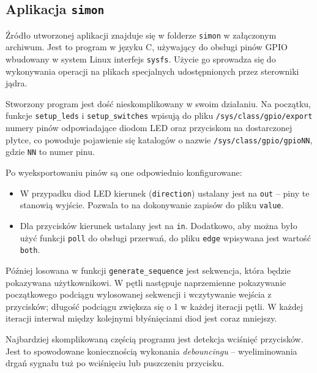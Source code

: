 \documentclass[10pt,a4paper]{article}
\begin{document}
\subsection{Aplikacja \texttt{simon}}

Źródło utworzonej aplikacji znajduje się w folderze \verb+simon+ w załączonym archiwum. Jest to program w języku C, używający do obsługi pinów GPIO wbudowany w system Linux interfejs \verb+sysfs+. Użycie go sprowadza się do wykonywania operacji na plikach specjalnych udostępnionych przez sterowniki jądra.

Stworzony program jest dość nieskomplikowany w swoim działaniu. Na początku, funkcje \verb+setup_leds+ i \verb+setup_switches+ wpisują do pliku \verb+/sys/class/gpio/export+ numery pinów odpowiadające diodom LED oraz przyciskom na dostarczonej płytce, co powoduje pojawienie się katalogów o nazwie \verb+/sys/class/gpio/gpioNN+, gdzie \verb+NN+ to numer pinu.

Po wyeksportowaniu pinów są one odpowiednio konfigurowane:
\begin{itemize}
	\item W przypadku diod LED kierunek (\verb+direction+) ustalany jest na \verb+out+ -- piny te stanowią wyjście. Pozwala to na dokonywanie zapisów do pliku \verb+value+.
	\item Dla przycisków kierunek ustalany jest na \verb+in+. Dodatkowo, aby można było użyć funkcji \verb+poll+ do obsługi przerwań, do pliku \verb+edge+ wpisywana jest wartość \verb+both+.
\end{itemize}

Później losowana w funkcji \verb+generate_sequence+ jest sekwencja, która będzie pokazywana użytkownikowi. W pętli następuje naprzemienne pokazywanie początkowego podciągu wylosowanej sekwencji i wczytywanie wejścia z przycisków; długość podciągu zwiększa się o 1 w każdej iteracji pętli. W każdej iteracji interwał między kolejnymi błyśnięciami diod jest coraz mniejszy.

Najbardziej skomplikowaną częścią programu jest detekcja wciśnięć przycisków. Jest to spowodowane koniecznością wykonania \emph{debouncingu} -- wyeliminowania drgań sygnału tuż po wciśnięciu lub puszczeniu przycisku.
\end{document}
